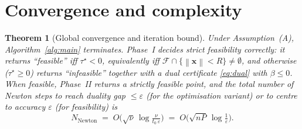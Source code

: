 \documentclass{amsart}
\newtheorem{theorem}{Theorem}
\newcommand{\norm}[1]{\left\lVert#1\right\rVert}
\begin{document}
\section{Convergence and complexity}\label{sec:conv}

\begin{theorem}[Global convergence and iteration bound]\label{thm:conv}
Under Assumption~(A), Algorithm~\ref{alg:main} terminates. Phase~I decides
strict feasibility correctly: it returns ``feasible'' iff $\tau^\star<0$, equivalently
iff $\mathcal F\cap\{\norm{\bm x}<R\}\neq\emptyset$, and otherwise
($\tau^\star\ge0$) returns ``infeasible'' together with a dual certificate
\eqref{eq:dual} with $\beta\le0$. When feasible, Phase~II returns a strictly feasible
point, and
the total number of Newton steps to reach duality gap $\le\varepsilon$ (for the
optimisation variant) or to centre to accuracy $\varepsilon$ (for feasibility) is
\begin{equation}\label{eq:itbound}
  N_{\mathrm{Newton}}
  \;=\;O\!\Big(\sqrt{\nu}\,\log\tfrac{\nu}{t_0\,\varepsilon}\Big)
  \;=\;O\!\Big(\sqrt{nP}\,\log\tfrac{1}{\varepsilon}\Big).
\end{equation}
\end{theorem}
\end{document}
